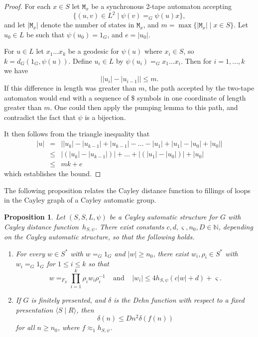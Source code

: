 \documentclass[11pt]{amsart}
\newcommand{\cA}{c}
\newcommand{\cB}{d}
\newcommand{\cC}{\varsigma}
\newcommand{\nD}{n_0}
\newcommand{\approxF}{\approx_1}
\newtheorem{proposition}[theorem]{Proposition}
\theoremstyle{definition}
\newcommand\N{\mathbb N}
\newcommand\distfun{Cayley distance function}
\renewcommand{\geq}{\geqslant} \renewcommand{\leq}{\leqslant} \renewcommand{\ge}{\geqslant} \renewcommand{\le}{\leqslant}
\begin{document}
\begin{proof}
For each $x\in S$ let $\texttt{M}_x$ be a synchronous 2-tape automaton accepting
\[\{(u,v)\in L^2\mid \psi(v)=_G\psi(u)x\},\]
and let $|\texttt{M}_x|$ denote the number of states in $\texttt{M}_x$, and
$m=\max\{|\texttt{M}_x|\mid x\in S\}$. Let $u_0\in L$ be such that $\psi(u_0)=1_G$, and $e=|u_0|$.

For  $u\in L$ let
$x_1\dots x_k$ be a geodesic  for $\psi(u)$ where $x_i\in S$, so $k={d_G(1_G,\psi(u))}$. Define $u_i\in L$ by $\psi(u_i)=_Gx_1\dots x_i$. Then for $i=1,\dots, k$ we have
 \[\left||u_i|-|u_{i-1}|\right|\leq m.\]
If this difference in length was greater than $m$, the path accepted by the two-tape automaton would end with a sequence of $\$$ symbols in one coordinate of length greater than $m$.
One could then apply the pumping lemma to this path, and contradict the fact that $\psi$ is a bijection.


It then follows from the triangle inequality that
\[\begin{array}{lll}
|u|&=&\left||u_k|-|u_{k-1}|+|u_{k-1}|-\dots -|u_1|+|u_1|-|u_{0}|+|u_0|\right|\\
&\leq &\left|\left(|u_k|-|u_{k-1}|\right)\right|+\dots +\left|\left(|u_1|-|u_{0}|\right)\right|+|u_0|\\
&\leq &m k+e\end{array}\]
 which establishes the bound.
\end{proof}



The following proposition relates the Cayley distance function to fillings of loops in the Cayley graph of a Cayley automatic group.


\begin{proposition}
\label{prop:dehnbound}
Let $(S,S,L,\psi)$ be a  Cayley automatic structure  for $G$ with \distfun\ $h_{S,\psi}$.
There exist constants
$\cA,\cB,\cC,\nD, D\in\N$, depending on the Cayley automatic structure, so that the following holds.
\begin{enumerate}\item
For every $w\in S^*$ with $w=_G1_G$ and $|w| \geq \nD$,
there exist $w_i,\rho_i\in S^*$ with $w_i=_G1_G$ for  $1\leq i\leq k$  so that \[w=_{F_S}\prod_{i=1}^k\rho_iw_i\rho_i^{-1}\ \ \ \ \
 \text{and} \ \ \ \ \ |w_i|\leq 4h_{S,\psi}(
 \cA|w|+\cB)+\cC.\]
\item
If  $G$ is finitely presented, and $\delta$ is the Dehn function with respect to a fixed presentation $\langle S\mid R\rangle$, then
\[\delta(n) \leq D n^2 \delta(f(n))\] for all $n\geq n_0$,
where $f\approxF h_{S,\psi}$.
\end{enumerate}
\end{proposition}
\end{document}
